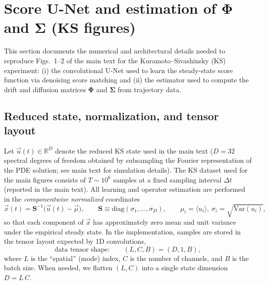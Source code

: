 \documentclass[%
  prl,
  reprint,
  amsmath,
  amssymb,
  aps
]{revtex4-2}
\newcommand{\vvec}[1]{\vec{#1}}
\begin{document}
\section{Score U-Net and estimation of \texorpdfstring{$\bm{\Phi}$ and $\bm{\Sigma}$}{Phi and Sigma} (KS figures)}
\label{sec:ks_unet_phi_sigma}

This section documents the numerical and architectural details needed to reproduce Figs.~1--2 of the main text for the Kuramoto--Sivashinsky (KS) experiment: (i) the convolutional U-Net used to learn the steady-state score function via denoising score matching and (ii) the estimator used to compute the drift and diffusion matrices $\bm{\Phi}$ and $\bm{\Sigma}$ from trajectory data.

\subsection{Reduced state, normalization, and tensor layout}
\label{sec:ks_data_layout}

Let $\vvec{u}(t)\in\mathbb{R}^{D}$ denote the reduced KS state used in the main text ($D=32$ spectral degrees of freedom obtained by subsampling the Fourier representation of the PDE solution; see main text for simulation details). The KS dataset used for the main figures consists of $T\sim 10^6$ samples at a fixed sampling interval $\Delta t$ (reported in the main text). All learning and operator estimation are performed in the \emph{componentwise normalized} coordinates
\begin{equation}
\vvec{x}(t)=\bm{S}^{-1}\bigl(\vvec{u}(t)-\vvec{\mu}\bigr),
\qquad
\bm{S}\equiv \mathrm{diag}(\sigma_1,\dots,\sigma_D),
\qquad
\mu_i=\langle u_i\rangle,\ \sigma_i=\sqrt{\mathrm{Var}(u_i)},
\label{eq:ks_normalization}
\end{equation}
so that each component of $\vvec{x}$ has approximately zero mean and unit variance under the empirical steady state. In the implementation, samples are stored in the tensor layout expected by 1D convolutions,
\begin{equation}
\text{data tensor shape:}\qquad (L, C, B)=(D,1,B),
\end{equation}
where $L$ is the ``spatial'' (mode) index, $C$ is the number of channels, and $B$ is the batch size. When needed, we flatten $(L,C)$ into a single state dimension $D=L\,C$.
\end{document}
